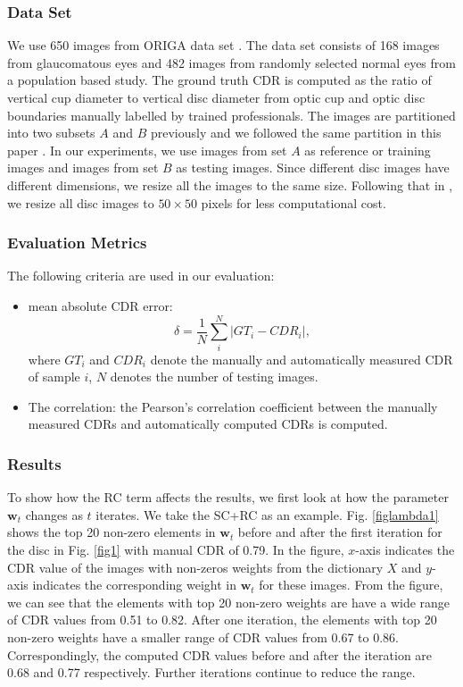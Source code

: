 \documentclass[journal]{IEEEtran}
\begin{document}
\subsubsection{Data Set}
We use 650 images from ORIGA data set \cite{origa}. The data set
consists of 168 images from glaucomatous eyes and 482 images from
randomly selected normal eyes from a population based study.
The ground truth CDR is computed as the ratio of vertical cup diameter to vertical disc diameter from optic cup and optic disc boundaries manually labelled by trained professionals.
The images are partitioned into two subsets $A$ and $B$ previously and we followed the same partition in this paper \cite{Cheng:17BOE}. In our experiments, we use images from set $A$ as reference or training images and images from set $B$ as testing images.
  Since different disc images have different dimensions, we resize all the images to  the same size. Following that in \cite{CJ15}, we resize all disc images to $50\times 50$ pixels for less computational cost.
%
 \subsubsection{Evaluation Metrics}
The following criteria are used in our evaluation:
 \begin{itemize}
 	 \item mean absolute CDR error: \begin{equation} \delta=\frac{1}{N}\sum_i^N |GT_{i}-CDR_i|,
 \end{equation} where
$GT_{i}$ and $CDR_i$ denote the manually and automatically measured CDR of sample
$i$, $N$ denotes the number of testing images.
 \item The correlation:  the Pearson's correlation
coefficient between the manually measured CDRs and automatically computed CDRs is computed.
  \end{itemize}
 \subsubsection{Results}
 To show how the RC term affects the results, we first look at how the parameter $\textbf{w}_t$ changes as $t$ iterates. We take the SC+RC as an example. %
 Fig. \ref{figlambda1} shows the top 20 non-zero elements in $\textbf{w}_t$ before and after the first iteration   for the disc in Fig. \ref{fig1} with manual CDR of 0.79. In the figure,   $x$-axis indicates the CDR value of the images with non-zeros weights from the dictionary $X$ and $y$-axis indicates the corresponding weight in $\textbf{w}_t$ for these images. From the figure, we can see that the elements with top 20 non-zero weights are have a wide range of CDR values from 0.51 to 0.82. After one iteration, the elements with top 20 non-zero weights have a smaller range of CDR values from  0.67 to 0.86.
  Correspondingly, the computed CDR values before and after the iteration are 0.68 and 0.77  respectively. Further iterations  continue  to reduce the range.
\end{document}
